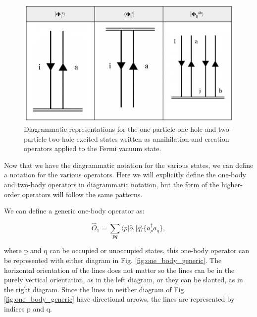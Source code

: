 \begin{figure}
    \centering
    \includegraphics[scale=0.25]{Images/Chapter2/Diagrams_2.png}
    \caption{Diagrammatic representations for the one-particle one-hole and two-particle two-hole excited states written as annihilation and creation operators applied to the Fermi vacuum state.}
    \label{fig:diagrams2}
\end{figure}

Now that we have the diagrammatic notation for the various states, we can define a notation for the various operators. Here we will explicitly define the one-body and two-body operators in diagrammatic notation, but the form of the higher-order operators will follow the same patterns.

We can define a generic one-body operator as:

\begin{equation}
    \hat{O}_1 = \sum_{pq}\langle p | \hat{o}_1 | q \rangle \{a^\dagger_pa_q\},    
\end{equation}

where p and q can be occupied or unoccupied states, this one-body operator can be represented with either diagram in Fig. \ref{fig:one_body_generic}. The horizontal orientation of the lines does not matter so the lines can be in the purely vertical orientation, as in the left diagram, or they can be slanted, as in the right diagram. Since the lines in neither diagram of Fig. \ref{fig:one_body_generic} have directional arrows, the lines are represented by indices p and q.

